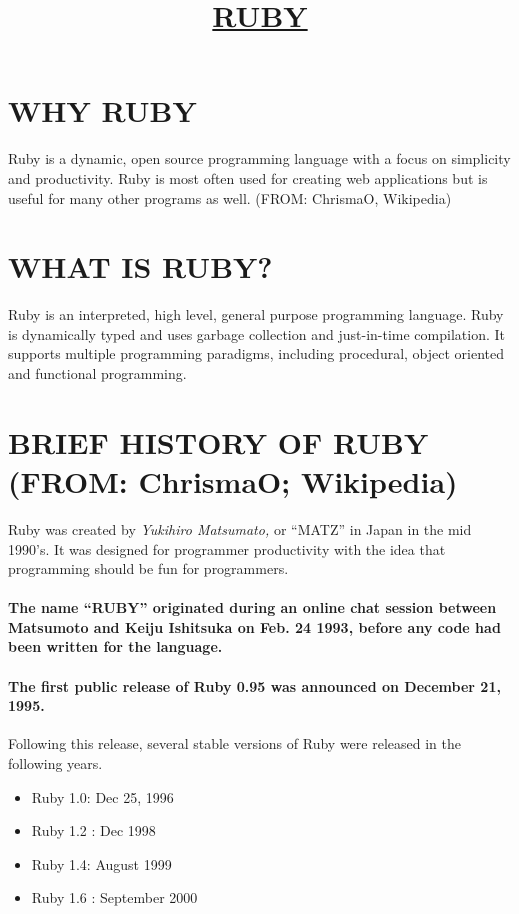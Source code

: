 \documentclass{article}
\begin{document}
	\title{\underline{\textbf{RUBY}}}
	\maketitle
	\section{WHY RUBY}
	Ruby is a dynamic, open source programming language with a focus on simplicity and productivity. Ruby is most often used for creating web applications but is useful for many other programs as well. (FROM: ChrismaO, Wikipedia)
	\section{WHAT IS RUBY?}
	Ruby is an interpreted, high level, general purpose programming language. Ruby is dynamically typed and uses garbage collection and just-in-time compilation. It supports multiple programming paradigms, including procedural, object oriented and functional programming.
	\section{BRIEF HISTORY OF RUBY (FROM: ChrismaO; Wikipedia)}
	Ruby was created by \emph{Yukihiro Matsumato,} or “MATZ” in Japan in the mid 1990’s. It was designed for programmer productivity with the idea that programming should be fun for programmers. 
	\paragraph{The name “RUBY” originated during an online chat session between Matsumoto and Keiju Ishitsuka on Feb. 24 1993, before any code had been written for the language.}
   \paragraph{The first public release of Ruby 0.95 was announced on December 21, 1995.} Following this release, several stable versions of Ruby were released in the following years.
   \begin{itemize}
   \item Ruby 1.0: Dec 25, 1996                           
	\item Ruby 1.2 : Dec 1998
	\item Ruby 1.4: August 1999
	\item Ruby 1.6 : September 2000
	\end{itemize}
\end{document}
